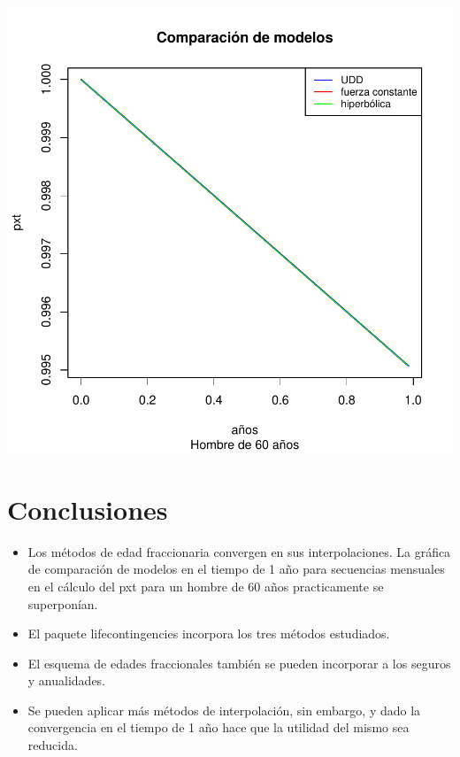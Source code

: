 \documentclass[12pt]{report}
\begin{document}
\includegraphics{Trabajo-Final-003}




\chapter{Conclusiones}

\begin{itemize}
\item Los métodos de edad fraccionaria convergen en sus interpolaciones. La gráfica de comparación de modelos en el tiempo de 1 año para secuencias mensuales en el cálculo del pxt para un hombre de 60 años practicamente se superponían.
\item El paquete lifecontingencies incorpora los tres métodos estudiados.
\item El esquema de edades fraccionales también se pueden incorporar a los seguros y anualidades.
\item Se pueden aplicar más métodos de interpolación, sin embargo, y dado la convergencia en el tiempo de 1 año hace que la utilidad del mismo sea reducida.
\end{itemize}


\printbibliography[
heading=bibintoc,
title={Bibliograf\'ia}
]

\printbibliography[heading=subbibintoc,type=article,title={Articles only}]
\end{document}
